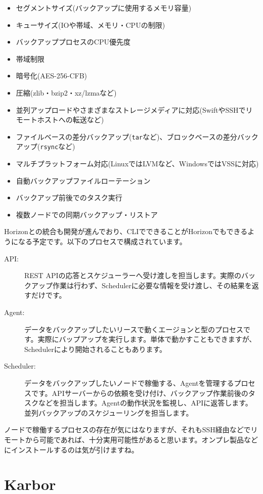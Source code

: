 \begin{itemize}
	\item セグメントサイズ(バックアップに使用するメモリ容量)
	\item キューサイズ(IOや帯域、メモリ・CPUの制限)
	\item バックアッププロセスのCPU優先度
	\item 帯域制限
	\item 暗号化(AES-256-CFB)
	\item 圧縮(zlib・bzip2・xz/lzmaなど)
	\item 並列アップロードやさまざまなストレージメディアに対応(SwiftやSSHでリモートホストへの転送など)
	\item ファイルベースの差分バックアップ(\verb|tar|など)、ブロックベースの差分バックアップ(\verb|rsync|など)
	\item マルチプラットフォーム対応(LinuxではLVMなど、WindowsではVSSに対応)
	\item 自動バックアップファイルローテーション
	\item バックアップ前後でのタスク実行
	\item 複数ノードでの同期バックアップ・リストア
\end{itemize}

Horizonとの統合も開発が進んでおり、CLIでできることがHorizonでもできるようになる予定です。以下のプロセスで構成されています。

\begin{description}
	\item[API:] REST APIの応答とスケジューラーへ受け渡しを担当します。実際のバックアップ作業は行わず、Schedulerに必要な情報を受け渡し、その結果を返すだけです。
	\item[Agent:] データをバックアップしたいリースで動くエージョンと型のプロセスです。実際にバップアップを実行します。単体で動かすこともできますが、Schedulerにより開始されることもあります。
	\item[Scheduler:] データをバックアップしたいノードで稼働する、Agentを管理するプロセスです。APIサーバーからの依頼を受け付け、バックアップ作業前後のタスクなどを担当します。Agentの動作状況を監視し、APIに返答します。並列バックアップのスケジューリングを担当します。
\end{description}

ノードで稼働するプロセスの存在が気にはなりますが、それもSSH経由などでリモートから可能であれば、十分実用可能性があると思います。オンプレ製品などにインストールするのは気が引けますね。

\section{Karbor}

